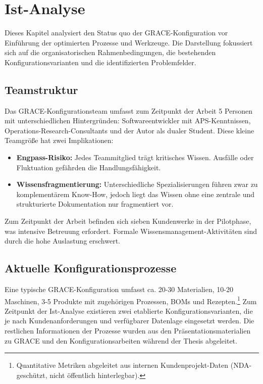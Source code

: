 \section{Ist-Analyse}
\label{sec:IstAnalyse}


Dieses Kapitel analysiert den Status quo der GRACE-Konfiguration vor Einführung der optimierten Prozesse und Werkzeuge. Die Darstellung fokussiert sich auf die organisatorischen Rahmenbedingungen, die bestehenden Konfigurationsvarianten und die identifizierten Problemfelder.

\subsection{Teamstruktur}
\label{subsec:Teamstruktur}

Das GRACE-Konfigurationsteam umfasst zum Zeitpunkt der Arbeit 5 Personen mit unterschiedlichen Hintergründen: Softwareentwickler mit APS-Kenntnissen, Operations-Research-Consultants und der Autor als dualer Student. Diese kleine Teamgröße hat zwei Implikationen:

\begin{itemize}
    \item \textbf{Engpass-Risiko:} Jedes Teammitglied trägt kritisches Wissen. Ausfälle oder Fluktuation gefährden die Handlungsfähigkeit.
    \item \textbf{Wissensfragmentierung:} Unterschiedliche Spezialisierungen führen zwar zu komplementärem Know-How, jedoch liegt das Wissen ohne eine zentrale und strukturierte Dokumentation nur fragmentiert vor. 
\end{itemize}

\noindent Zum Zeitpunkt der Arbeit befinden sich sieben Kundenwerke in der Pilotphase, was intensive Betreuung erfordert. Formale Wissensmanagement-Aktivitäten sind durch die hohe Auslastung erschwert.


\subsection{Aktuelle Konfigurationsprozesse}
\label{subsec:AktuelleProzesse}

Eine typische GRACE-Konfiguration umfasst ca. 20-30 Materialien, 10-20 Maschinen, 3-5 Produkte mit zugehörigen Prozessen, BOMs und Rezepten.\footnote{Quantitative Metriken abgeleitet aus internen Kundenprojekt-Daten (NDA-geschützt, nicht öffentlich hinterlegbar).} Zum Zeitpunkt der Ist-Analyse existieren zwei etablierte Konfigurationsvarianten, die je nach Kundenanforderungen und verfügbarer Datenlage eingesetzt werden. Die restlichen Informationen der Prozesse wurden aus den Präsentationsmaterialien zu GRACE und den Konfigurationsarbeiten während der Thesis abgeleitet.

